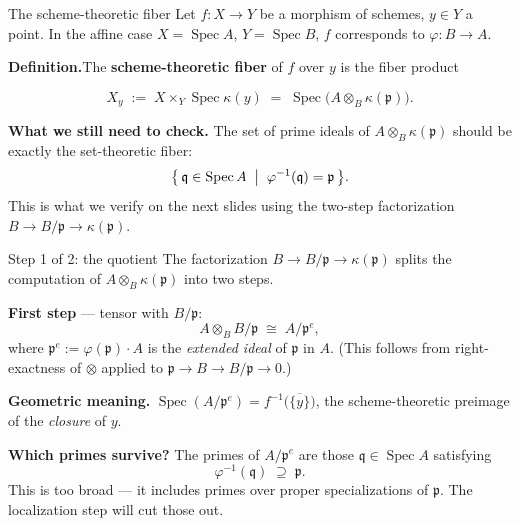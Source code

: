 \documentclass[aspectratio=169,12pt]{beamer}
\newenvironment{mathbox}{%
  \begin{tcolorbox}[mathbox]}{%
  \end{tcolorbox}}
\begin{document}
\begin{frame}{The scheme-theoretic fiber}
  Let $f : X \to Y$ be a morphism of schemes, $y \in Y$ a point.
  In the affine case $X = \operatorname{Spec} A$, $Y = \operatorname{Spec} B$,
  $f$ corresponds to $\varphi : B \to A$.

  \medskip

  \textbf{Definition.}\enspace The \textbf{scheme-theoretic fiber} of $f$
  over $y$ is the fiber product
  \begin{mathbox}
  \[
    X_y \;:=\; X \times_Y \operatorname{Spec}\kappa(y)
         \;=\; \operatorname{Spec}\!\bigl(A \otimes_B \kappa(\mathfrak{p})\bigr).
  \]
  \end{mathbox}

  \medskip

  \textbf{What we still need to check.}\enspace
  The set of prime ideals of $A \otimes_B \kappa(\mathfrak{p})$ should be
  exactly the set-theoretic fiber:
  \[
    \bigl\{\,\mathfrak{q} \in \operatorname{Spec} A
    \;\bigm|\; \varphi^{-1}(\mathfrak{q}) = \mathfrak{p}\,\bigr\}.
  \]
  This is what we verify on the next slides using the two-step factorization
  $B \to B/\mathfrak{p} \to \kappa(\mathfrak{p})$.
\end{frame}

\begin{frame}{Step 1 of 2: the quotient}
  The factorization $B \to B/\mathfrak{p} \to \kappa(\mathfrak{p})$
  splits the computation of $A \otimes_B \kappa(\mathfrak{p})$ into two steps.

  \medskip

  \textbf{First step} — tensor with $B/\mathfrak{p}$:
  \[
    A \otimes_B B/\mathfrak{p} \;\cong\; A/\mathfrak{p}^e,
  \]
  where $\mathfrak{p}^e := \varphi(\mathfrak{p})\cdot A$ is the
  \emph{extended ideal} of $\mathfrak{p}$ in $A$.
  (This follows from right-exactness of $\otimes$
  applied to $\mathfrak{p} \to B \to B/\mathfrak{p} \to 0$.)

  \medskip

  \textbf{Geometric meaning.}\enspace
  $\operatorname{Spec}(A/\mathfrak{p}^e) = f^{-1}\!\bigl(\overline{\{y\}}\bigr)$,
  the scheme-theoretic preimage of the \emph{closure} of $y$.

  \medskip

  \textbf{Which primes survive?}\enspace
  The primes of $A/\mathfrak{p}^e$ are those
  $\mathfrak{q} \in \operatorname{Spec} A$ satisfying
  \[
    \varphi^{-1}(\mathfrak{q}) \;\supseteq\; \mathfrak{p}.
  \]
  This is too broad — it includes primes over proper specializations of
  $\mathfrak{p}$. The localization step will cut those out.
\end{frame}
\end{document}
